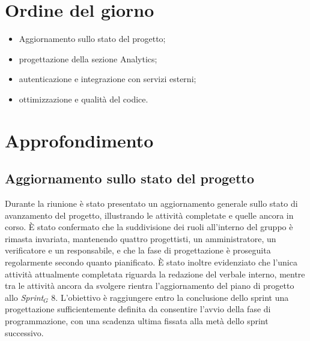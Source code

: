 \documentclass[10pt, letterpaper]{article}
\begin{document}
\makeTitlePage

\newpage 
{}
\makeChangelog

\newpage

\tableofcontents

\newpage


\makeMeetingParticipantsTable

\section{Ordine del giorno}
\begin{itemize}
  \item Aggiornamento sullo stato del progetto;
  \item progettazione della sezione Analytics;
  \item autenticazione e integrazione con servizi esterni;
  \item ottimizzazione e qualità del codice.
\end{itemize}

\section{Approfondimento}

\subsection{Aggiornamento sullo stato del progetto}
Durante la riunione è stato presentato un aggiornamento generale sullo stato di avanzamento del progetto, illustrando le attività completate e quelle ancora in corso. È stato confermato che la suddivisione dei ruoli all’interno del gruppo è rimasta invariata, mantenendo quattro progettisti, un amministratore, un verificatore e un responsabile, e che la fase di progettazione è proseguita regolarmente secondo quanto pianificato.
\noindent
È stato inoltre evidenziato che l’unica attività attualmente completata riguarda la redazione del verbale interno, mentre tra le attività ancora da svolgere rientra l’aggiornamento del piano di progetto allo \textit{Sprint$_G$} 8. L’obiettivo è raggiungere entro la conclusione dello sprint una progettazione sufficientemente definita da consentire l’avvio della fase di programmazione, con una scadenza ultima fissata alla metà dello sprint successivo.
\end{document}
